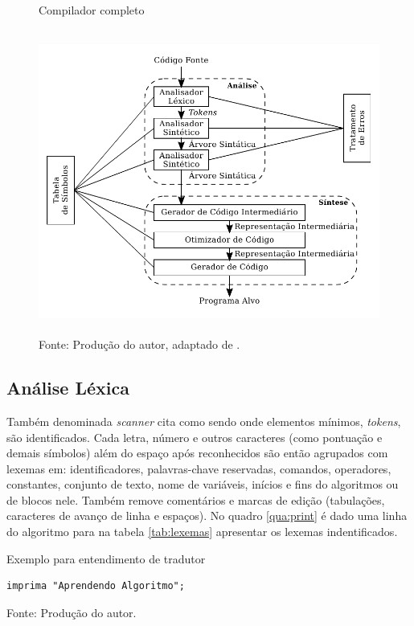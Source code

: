 \begin{figure}[h]
  \caption{\ifdraft{\color{green}}{}Compilador completo}\label{fig:fullcompiler}
  \centering
\includegraphics[width=\textwidth,height=10cm,keepaspectratio]{figures/compilador-completo.pdf}
  \caption*{\ifdraft{\color{green}}{}\footnotesize Fonte: Produção do autor, adaptado de .}
\end{figure}

%
\subsection{Análise Léxica}

Também denominada \textit{scanner} cita  como sendo onde elementos mínimos, \textit{tokens}, são identificados. Cada letra, número e outros caracteres (como pontuação e demais símbolos)  além do espaço após reconhecidos são então agrupados com lexemas em: identificadores, palavras-chave reservadas, comandos, operadores, constantes, conjunto de texto, nome de variáveis, inícios e fins do algoritmos ou de blocos nele. Também remove comentários e marcas de edição (tabulações, caracteres de avanço de linha e espaços). No quadro \ref{qua:print} é dado uma linha do algoritmo para na tabela \ref{tab:lexemas} apresentar os lexemas indentificados.

\begin{quadro}[h]
\centering
  \caption{Exemplo para entendimento de tradutor}\label{qua:print}
\begin{lstlisting}[language=ual,frame=single]
  imprima "Aprendendo Algoritmo";
\end{lstlisting}
  \caption*{\ifdraft{\color{green}}{}\footnotesize Fonte: Produção do autor.}
\end{quadro}

